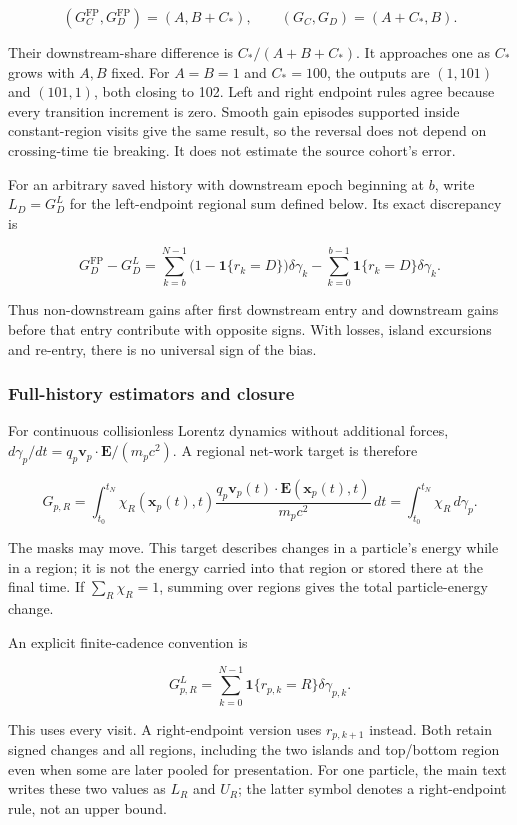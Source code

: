 \[
(G_C^{\mathrm{FP}},G_D^{\mathrm{FP}})=(A,B+C_*),\qquad
(G_C,G_D)=(A+C_*,B).
\]

Their downstream-share difference is \(C_*/(A+B+C_*)\). It approaches
one as \(C_*\) grows with \(A,B\) fixed. For \(A=B=1\) and \(C_*=100\),
the outputs are \((1,101)\) and \((101,1)\), both closing to 102. Left
and right endpoint rules agree because every transition increment is
zero. Smooth gain episodes supported inside constant-region visits give
the same result, so the reversal does not depend on crossing-time tie
breaking. It does not estimate the source cohort's error.

For an arbitrary saved history with downstream epoch beginning at \(b\),
write \(L_D=G_D^L\) for the left-endpoint regional sum defined below.
Its exact discrepancy is

\[
G_D^{\mathrm{FP}}-G_D^L
=\sum_{k=b}^{N-1}\bigl(1-\mathbf1\{r_k=D\}\bigr)\delta\gamma_k
 -\sum_{k=0}^{b-1}\mathbf1\{r_k=D\}\delta\gamma_k.
\]

Thus non-downstream gains after first downstream entry and downstream
gains before that entry contribute with opposite signs. With losses,
island excursions and re-entry, there is no universal sign of the bias.

\subsubsection{Full-history estimators and
closure}\label{full-history-estimators-and-closure}

For continuous collisionless Lorentz dynamics without additional forces,
\(d\gamma_p/dt=q_p\mathbf v_p\cdot\mathbf E/(m_pc^2)\). A regional
net-work target is therefore

\[
G_{p,R}=\int_{t_0}^{t_N}
 \chi_R(\mathbf x_p(t),t)
 \frac{q_p\mathbf v_p(t)\cdot\mathbf E(\mathbf x_p(t),t)}{m_pc^2}\,dt
=\int_{t_0}^{t_N}\chi_R\,d\gamma_p.
\]

The masks may move. This target describes changes in a particle's energy
while in a region; it is not the energy carried into that region or
stored there at the final time. If \(\sum_R\chi_R=1\), summing over
regions gives the total particle-energy change.

An explicit finite-cadence convention is

\[
G_{p,R}^{L}=\sum_{k=0}^{N-1}
 \mathbf1\{r_{p,k}=R\}\delta\gamma_{p,k}.
\]

This uses every visit. A right-endpoint version uses \(r_{p,k+1}\)
instead. Both retain signed changes and all regions, including the two
islands and top/bottom region even when some are later pooled for
presentation. For one particle, the main text writes these two values as
\(L_R\) and \(U_R\); the latter symbol denotes a right-endpoint rule,
not an upper bound.

